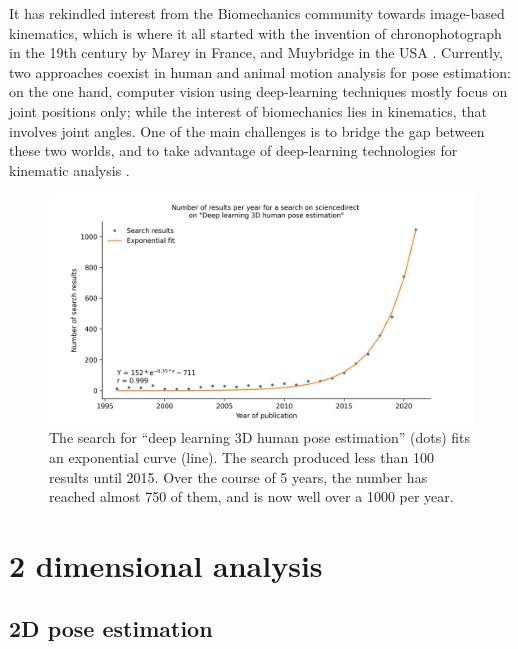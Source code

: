 It has rekindled interest from the Biomechanics community towards image-based kinematics, which is where it all started with the invention of chronophotograph in the 19th century by Marey in France, and Muybridge in the USA \cite{Baker2007}. Currently, two approaches coexist in human and animal motion analysis for pose estimation: on the one hand, computer vision using deep-learning techniques mostly focus on joint positions only; while the interest of biomechanics lies in kinematics, that involves joint angles. One of the main challenges is to bridge the gap between these two worlds, and to take advantage of deep-learning technologies for kinematic analysis \cite{Cronin2021,Seethapathi2019}. 

\begin{figure}[hbtp]
	\centering
	\def\svgwidth{1\columnwidth}
	\fontsize{10pt}{10pt}\selectfont
	\includegraphics[width=\linewidth]{"../Chap1/Figure/Fig_exp.png"}
	\caption{The search for “deep learning 3D human pose estimation” (dots) fits an exponential curve (line). The search produced less than 100 results until 2015. Over the course of 5 years, the number has reached almost 750 of them, and is now well over a 1000 per year.}
	\label{fig_exp}
\end{figure}
\FloatBarrier

\section{2 dimensional analysis}

\subsection{2D pose estimation}

